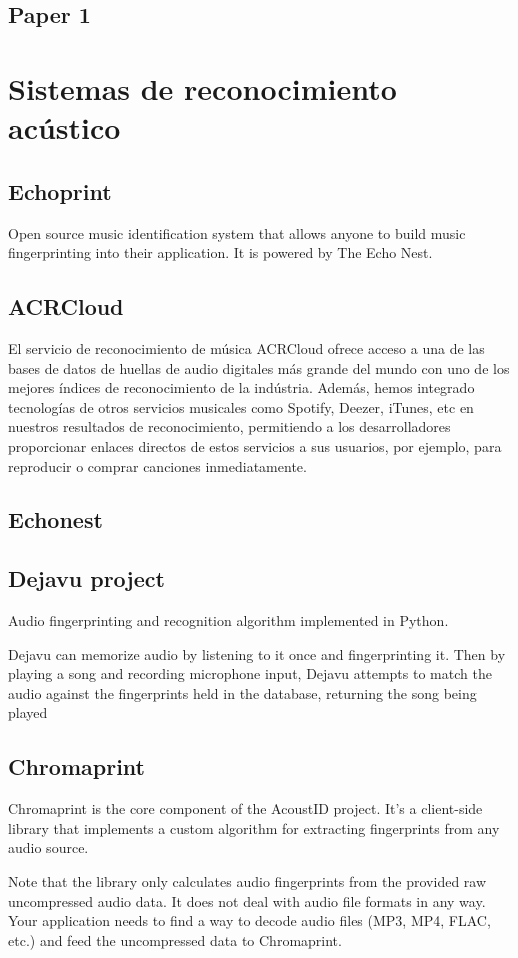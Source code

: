 \subsection{Paper 1}
\lipsum[2-4]

\section{Sistemas de reconocimiento acústico} \label{sec:SistemasRA}


\subsection{Echoprint}
Open source music identification system that allows anyone to build music fingerprinting into their application. It is powered by The Echo Nest.

\subsection{ACRCloud}
El servicio de reconocimiento de música ACRCloud ofrece acceso a una de las bases de datos de huellas de audio digitales más grande del mundo con uno de los mejores índices de reconocimiento de la indústria.
Además, hemos integrado tecnologías de otros servicios musicales como Spotify, Deezer, iTunes, etc en nuestros resultados de reconocimiento, permitiendo a los desarrolladores proporcionar enlaces directos de estos servicios a sus usuarios, por ejemplo, para reproducir o comprar canciones inmediatamente.




\subsection{Echonest}
\lipsum[2-4]

\subsection{Dejavu project}
Audio fingerprinting and recognition algorithm implemented in Python.

Dejavu can memorize audio by listening to it once and fingerprinting it. Then by playing a song and recording microphone input, Dejavu attempts to match the audio against the fingerprints held in the database, returning the song being played


\subsection{Chromaprint}
Chromaprint is the core component of the AcoustID project. It's a client-side library that implements a custom algorithm for extracting fingerprints from any audio source.

Note that the library only calculates audio fingerprints from the provided raw uncompressed audio data. It does not deal with audio file formats in any way. Your application needs to find a way to decode audio files (MP3, MP4, FLAC, etc.) and feed the uncompressed data to Chromaprint.



